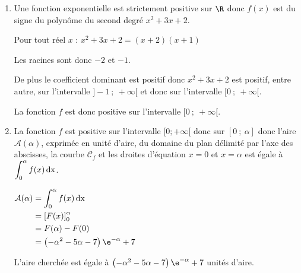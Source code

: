 \begin{enumerate}
\begin{enumerate}
Elle est croissante sur $\left]\dfrac{-1-\sqrt{5}}{2}~;~\dfrac{-1+\sqrt{5}}{2}\right[$.
	\end{enumerate}
\item Une fonction exponentielle est strictement positive sur $\R$ donc $f(x)$ est du signe du polynôme du second degré $x^2 + 3x + 2$.

Pour tout réel $x$ : $x^2+3x+2 =(x+2)(x+1)$ 

Les racines sont donc $-2$ et $-1$.

De plus le coefficient dominant est positif donc $x^2+3x+2$ est positif, entre autre, sur l'intervalle $]-1~;~ +\infty[$ et donc sur l'intervalle $[0~;~+\infty[$.

La fonction $f$ est donc positive sur l'intervalle $[0~;~+\infty[$.

\item La fonction $f$ est positive sur l'intervalle $[0;+\infty[$ donc sur $[0~;~\alpha]$ donc l'aire $\mathcal{A}(\alpha)$, exprimée en unité d'aire, du domaine du plan délimité par l'axe des abscisses, la courbe $\mathcal{C}_{f}$ et les droites d'équation $x=0$ et $x=\alpha$ est égale à $\displaystyle  \int_0^{\alpha}f(x) \,\rm{d} x$.

$\begin{aligned} \mathcal{A}(\alpha) & = \displaystyle  \int_0^{\alpha}f(x) \,\rm{d} x\\
	& = {\left[ F(x) \right]}_0^{\alpha}\\
	& = F(\alpha)-F(0)\\
	&= \left( -\alpha^2-5\alpha-7\right)\e^{-\alpha}+ 7
\end{aligned}$

L'aire cherchée est égale à $ \left( -\alpha^2-5\alpha-7\right)\e^{-\alpha}+7$ unités d'aire.

\end{enumerate}
